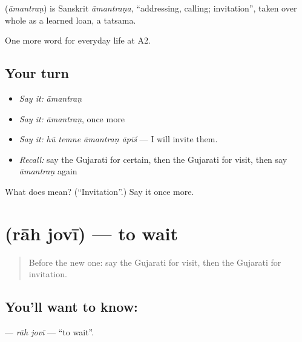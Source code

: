 \begin{cousinweb}
\textbf{} (\emph{āmantraṇ}) is Sanskrit \emph{āmantraṇa}, \textquotedblleft{}addressing, calling; invitation\textquotedblright{}, taken over whole as a learned loan, a tatsama.
\end{cousinweb}

\begin{grammarlens}[title={What you've built}]
One more word for everyday life at A2.
\end{grammarlens}

\subsection*{Your turn}
\begin{itemize}
\raggedright
  \item \emph{Say it:} \emph{āmantraṇ}
  \item \emph{Say it:} \emph{āmantraṇ}, once more
  \item \emph{Say it:} \emph{hũ temne āmantraṇ āpīś} — I will invite them.
  \item \emph{Recall:} say the Gujarati for certain, then the Gujarati for visit, then say \emph{āmantraṇ} again
\end{itemize}

\begin{tcolorbox}[breakable,colback=teal!4,colframe=teal!35!black,title={Before you move on}]
What does  mean? (\textquotedblleft{}Invitation\textquotedblright{}.) Say it once more.
\end{tcolorbox}
\section[\texorpdfstring{\gu{રાહ} \gu{જોવી} (rāh jovī)}{રાહ જોવી (rāh jovī)}]{  (rāh jovī) — to wait}

\label{lesson:GU-C180-rah-jovi}



\begin{quote}
Before the new one: say the Gujarati for visit, then the Gujarati for invitation.
\end{quote}

\subsection*{You'll want to know:  }
\textbf{ } — \emph{rāh jovī} — \textquotedblleft{}to wait\textquotedblright{}.

